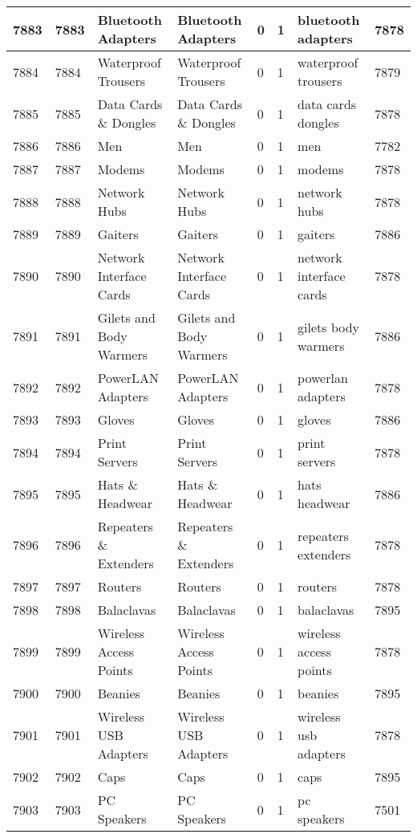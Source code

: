 \begin{longtable}{|l|l|l|l|l|l|l|l|}
7883 & 7883 & Bluetooth Adapters & Bluetooth Adapters & 0 & 1 & bluetooth adapters & 7878 \\ \hline 
7884 & 7884 & Waterproof Trousers & Waterproof Trousers & 0 & 1 & waterproof trousers & 7879 \\ \hline 
7885 & 7885 & Data Cards \& Dongles & Data Cards \& Dongles & 0 & 1 & data cards dongles & 7878 \\ \hline 
7886 & 7886 & Men & Men & 0 & 1 & men & 7782 \\ \hline 
7887 & 7887 & Modems & Modems & 0 & 1 & modems & 7878 \\ \hline 
7888 & 7888 & Network Hubs & Network Hubs & 0 & 1 & network hubs & 7878 \\ \hline 
7889 & 7889 & Gaiters & Gaiters & 0 & 1 & gaiters & 7886 \\ \hline 
7890 & 7890 & Network Interface Cards & Network Interface Cards & 0 & 1 & network interface cards & 7878 \\ \hline 
7891 & 7891 & Gilets and Body Warmers & Gilets and Body Warmers & 0 & 1 & gilets body warmers & 7886 \\ \hline 
7892 & 7892 & PowerLAN Adapters & PowerLAN Adapters & 0 & 1 & powerlan adapters & 7878 \\ \hline 
7893 & 7893 & Gloves & Gloves & 0 & 1 & gloves & 7886 \\ \hline 
7894 & 7894 & Print Servers & Print Servers & 0 & 1 & print servers & 7878 \\ \hline 
7895 & 7895 & Hats \& Headwear & Hats \& Headwear & 0 & 1 & hats headwear & 7886 \\ \hline 
7896 & 7896 & Repeaters \& Extenders & Repeaters \& Extenders & 0 & 1 & repeaters extenders & 7878 \\ \hline 
7897 & 7897 & Routers & Routers & 0 & 1 & routers & 7878 \\ \hline 
7898 & 7898 & Balaclavas & Balaclavas & 0 & 1 & balaclavas & 7895 \\ \hline 
7899 & 7899 & Wireless Access Points & Wireless Access Points & 0 & 1 & wireless access points & 7878 \\ \hline 
7900 & 7900 & Beanies & Beanies & 0 & 1 & beanies & 7895 \\ \hline 
7901 & 7901 & Wireless USB Adapters & Wireless USB Adapters & 0 & 1 & wireless usb adapters & 7878 \\ \hline 
7902 & 7902 & Caps & Caps & 0 & 1 & caps & 7895 \\ \hline 
7903 & 7903 & PC Speakers & PC Speakers & 0 & 1 & pc speakers & 7501 \\ \hline 

\end{longtable}
